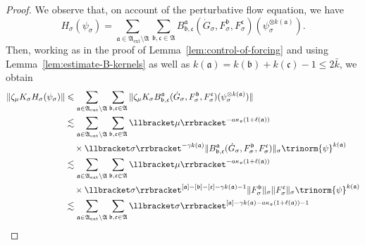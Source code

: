 \documentclass{article}
\numberwithin{equation}{section}
\theoremstyle{plain}
\theoremstyle{definition}
\begin{document}
\begin{proof}
  We observe that, on account of the perturbative flow equation, we have
  \[ H_{\sigma}  (\psi_{\sigma}) = \sum_{\mathfrak{a} \in
     \mathfrak{A}_{\mathrm{ext}} \setminus \mathfrak{A}}
     \sum_{\mathfrak{b}, \mathfrak{c} \in \mathfrak{A}}
     B^{\mathfrak{a}}_{\mathfrak{b}, \mathfrak{c}}
     (\dot{G}_{\sigma}, F^{\mathfrak{b}}_{\sigma}, F^{\mathfrak{c}}_{\sigma})
     (\psi^{\otimes k (\mathfrak{a})}_{\sigma}) . \]
  Then, working
  as in the proof of Lemma~\ref{lem:control-of-forcing} and using
  Lemma~\ref{lem:estimate-B-kernels} as well as $k (\mathfrak{a}) = k
  (\mathfrak{b}) + k (\mathfrak{c}) - 1 \leqslant 2 \bar{k}$, we obtain
  \begin{align*}
    \| \zeta_{\mu} K_{\sigma} H_{\sigma} (\psi_{\sigma}) \| &\leqslant 
    \sum_{\mathfrak{a} \in \mathfrak{A}_{\mathrm{ext}} \setminus \mathfrak{A}}
    \sum_{\mathfrak{b}, \mathfrak{c} \in \mathfrak{A}} \|
    \zeta_{\mu} K_{\sigma} B^{\mathfrak{a}}_{\mathfrak{b}, \mathfrak{c}}
    (\dot{G}_{\sigma}, F^{\mathfrak{b}}_{\sigma}, F^{\mathfrak{c}}_{\sigma})
    (\psi^{\otimes k (\mathfrak{a})}_{\sigma}) \|\\
 &\lesssim  \sum_{\mathfrak{a} \in \mathfrak{A}_{\mathrm{ext}} \setminus \mathfrak{A}}
    \sum_{\mathfrak{b}, \mathfrak{c} \in \mathfrak{A}}
    \llbracket \mu \rrbracket^{- a \kappa_{\mathfrak{o}}
    (1 + \ell (\mathfrak{a}))}\\
 &\quad \times
    \llbracket \sigma \rrbracket^{- \gamma k (\mathfrak{a})}
    \| B^{\mathfrak{a}}_{\mathfrak{b}, \mathfrak{c}} (\dot{G}_{\sigma},
    F^{\mathfrak{b}}_{\sigma}, F^{\mathfrak{c}}_{\sigma}) \|_{\sigma}
    \trinorm{ \psi }^{k (\mathfrak{a})}\\
 &\lesssim  \sum_{\mathfrak{a} \in \mathfrak{A}_{\mathrm{ext}} \setminus \mathfrak{A}}
    \sum_{\mathfrak{b}, \mathfrak{c} \in \mathfrak{A}}
    \llbracket \mu \rrbracket^{- a \kappa_{\mathfrak{o}}
    (1 + \ell (\mathfrak{a}))}\\
 &\quad \times
    \llbracket \sigma \rrbracket^{[\mathfrak{a}] - [\mathfrak{b}]
    - [\mathfrak{c}] - \gamma k (\mathfrak{a})-1}
    \| F^{\mathfrak{b}}_{\sigma} \|_{\sigma}
    \| F^{\mathfrak{c}}_{\sigma} \|_{\sigma}
    \trinorm{ \psi }^{k (\mathfrak{a})}\\
 &\lesssim  \sum_{\mathfrak{a} \in \mathfrak{A}_{\mathrm{ext}} \setminus \mathfrak{A}}
    \sum_{\mathfrak{b}, \mathfrak{c} \in \mathfrak{A}}
    \llbracket \sigma \rrbracket^{[\mathfrak{a}] - \gamma k (\mathfrak{a})
    - a \kappa_{\mathfrak{o}} (1 + \ell (\mathfrak{a})) - 1}\\

\end{align*}
\end{proof}
\end{document}
